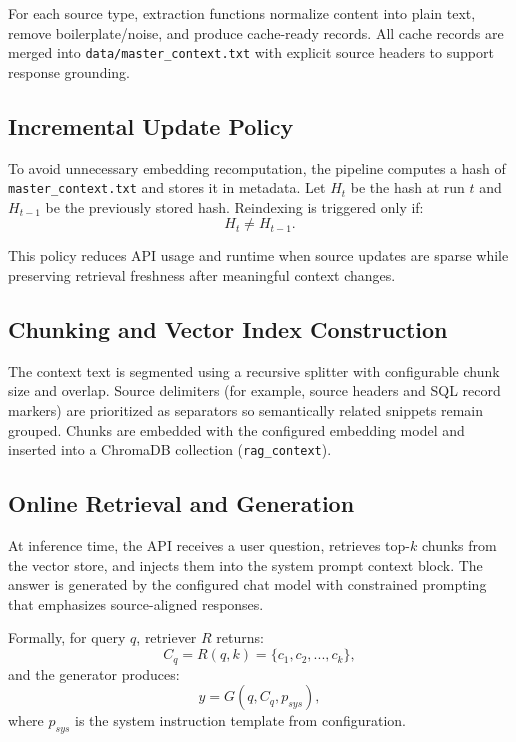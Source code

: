 \documentclass[11pt,a4paper]{article}
\begin{document}
For each source type, extraction functions normalize content into plain text, remove boilerplate/noise, and produce cache-ready records. All cache records are merged into \texttt{data/master\_context.txt} with explicit source headers to support response grounding.

\subsection{Incremental Update Policy}

To avoid unnecessary embedding recomputation, the pipeline computes a hash of \texttt{master\_context.txt} and stores it in metadata. Let $H_t$ be the hash at run $t$ and $H_{t-1}$ be the previously stored hash. Reindexing is triggered only if:
\begin{equation}
H_t \neq H_{t-1}.
\end{equation}

This policy reduces API usage and runtime when source updates are sparse while preserving retrieval freshness after meaningful context changes.

\subsection{Chunking and Vector Index Construction}

The context text is segmented using a recursive splitter with configurable chunk size and overlap. Source delimiters (for example, source headers and SQL record markers) are prioritized as separators so semantically related snippets remain grouped. Chunks are embedded with the configured embedding model and inserted into a ChromaDB collection (\texttt{rag\_context}).

\subsection{Online Retrieval and Generation}

At inference time, the API receives a user question, retrieves top-$k$ chunks from the vector store, and injects them into the system prompt context block. The answer is generated by the configured chat model with constrained prompting that emphasizes source-aligned responses.

Formally, for query $q$, retriever $R$ returns:
\begin{equation}
C_q = R(q, k) = \{c_1, c_2, ..., c_k\},
\end{equation}
and the generator produces:
\begin{equation}
y = G\left(q, C_q, p_{sys}\right),
\end{equation}
where $p_{sys}$ is the system instruction template from configuration.
\end{document}
